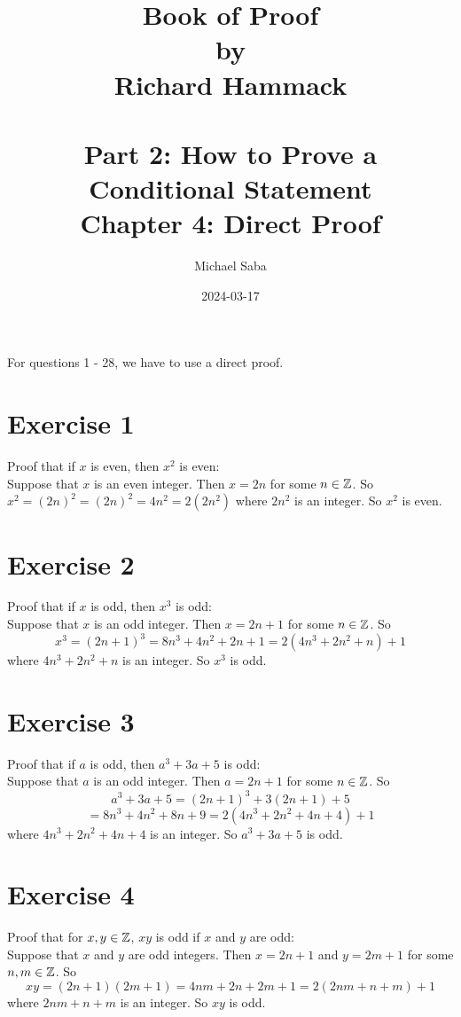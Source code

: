 \documentclass[12pt]{article}
\title{%
    \Huge Book of Proof \\
    \large by \\
    \Large Richard Hammack \\~\\
    \huge Part 2: How to Prove a Conditional Statement \\
    \LARGE Chapter 4: Direct Proof
}
\date{2024-03-17}
\author{Michael Saba}
\begin{document}
    \maketitle
    \newpage
    \setlength{\parindent}{0pt}

    For questions 1 - 28, we have to use a direct proof. \\

    \section*{Exercise 1}
    Proof that if $x$ is even,
    then $x^2$ is even: \\
    Suppose that $x$ is an even integer.
    Then $x = 2n$ for some $n \in \mathbb{Z}$.
    So $x^2 = (2n)^2 = (2n)^2 = 4n^2 = 2(2n^2)$
    where $2n^2$ is an integer.
    So $x^2$ is even.

    \section*{Exercise 2}
    Proof that if $x$ is odd,
    then $x^3$ is odd: \\
    Suppose that $x$ is an odd integer.
    Then $x = 2n+1$ for some $n \in \mathbb{Z}$.
    So
    \[ x^3 = (2n+1)^3 = 8n^3 + 4n^2 + 2n + 1 = 2(4n^3 + 2n^2 + n) + 1 \]
    where $4n^3 + 2n^2 + n$ is an integer.
    So $x^3$ is odd. \\

    \section*{Exercise 3}
    Proof that if $a$ is odd,
    then $a^3 + 3a + 5$ is odd: \\
    Suppose that $a$ is an odd integer.
    Then $a = 2n+1$ for some $n \in \mathbb{Z}$.
    So 
    \[ a^3 + 3a + 5 = (2n+1)^3 + 3(2n+1) + 5 \]
    \[ = 8n^3 + 4n^2 + 8n + 9 = 2(4n^3 + 2n^2 + 4n + 4) + 1 \]
    where $4n^3 + 2n^2 + 4n + 4$ is an integer.
    So $a^3 + 3a + 5$ is odd. \\

    \section*{Exercise 4}
    Proof that for $x, y \in \mathbb{Z}$,
    $xy$ is odd if $x$ and $y$ are odd: \\
    Suppose that $x$ and $y$ are odd integers.
    Then $x = 2n+1$ and $y = 2m+1$ for some $n, m \in \mathbb{Z}$.
    So 
    \[ xy = (2n+1)(2m+1) = 4nm + 2n + 2m + 1 = 2(2nm + n + m) + 1\]
    where $2nm + n + m$ is an integer.
    So $xy$ is odd. \\
\end{document}
